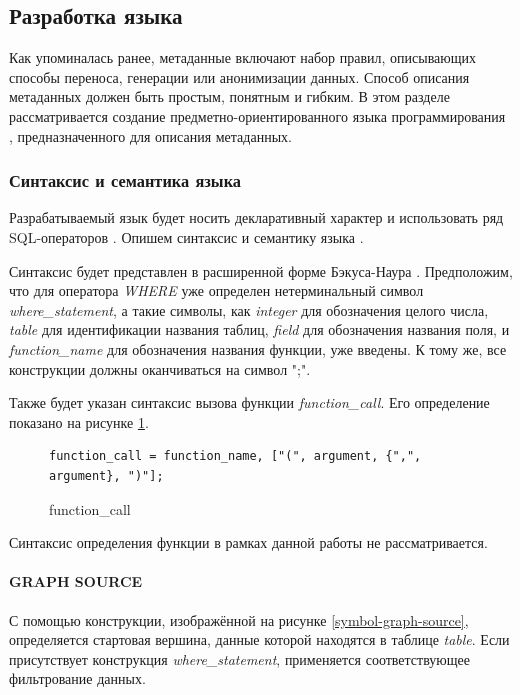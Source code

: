 \subsection{Разработка языка}
Как упоминалась ранее, метаданные включают набор правил, описывающих способы переноса, генерации или анонимизации данных. Способ описания метаданных должен быть простым, понятным и гибким. В этом разделе рассматривается создание предметно-ориентированного языка программирования \cite{dsl-how-create}, предназначенного для описания метаданных.

\subsubsection{Синтаксис и семантика языка}

Разрабатываемый язык будет носить декларативный характер и использовать ряд SQL-операторов \cite{sql}. Опишем синтаксис и семантику языка \cite{syntax-and-semantics}.

Синтаксис будет представлен в расширенной форме Бэкуса-Наура \cite{ebnf}. Предположим, что для оператора \textit{WHERE} уже определен нетерминальный символ \textit{where\_statement}, а такие символы, как \textit{integer} для обозначения целого числа, \textit{table} для идентификации названия таблиц, \textit{field} для обозначения названия поля, и \textit{function\_name} для обозначения названия функции, уже введены. К тому же, все конструкции должны оканчиваться на символ ";".

Также будет указан синтаксис вызова функции \textit{function\_call}. Его определение показано на рисунке \ref{symbol-function-call}.

\begin{figure}
  \begin{lstlisting}
function_call = function_name, ["(", argument, {",", argument}, ")"];
  \end{lstlisting}
  \caption{function\_call}
  \label{symbol-function-call}
\end{figure}

Синтаксис определения функции в рамках данной работы не рассматривается.

\paragraph{GRAPH SOURCE}

С помощью конструкции, изображённой на рисунке \ref{symbol-graph-source}, определяется стартовая вершина, данные которой находятся в таблице \textit{table}. Если присутствует конструкция \textit{where\_statement}, применяется соответствующее фильтрование данных.

